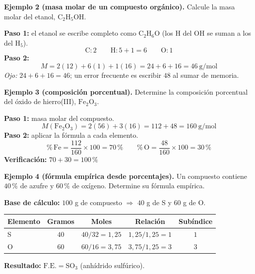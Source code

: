 \documentclass[12pt, letterpaper]{article}
\newcommand{\pc}{\text{\%}}
\begin{document}
\noindent\textbf{Ejemplo 2 (masa molar de un compuesto orgánico).} Calcule la masa molar del etanol, $\text{C}_2\text{H}_5\text{OH}$.

\begin{cuadrosolucion}
  \textbf{Paso 1:} el etanol se escribe completo como $\text{C}_2\text{H}_6\text{O}$ (los H del OH se suman a los del $\text{H}_5$).
  \[
    \text{C}:2 \qquad \text{H}: 5+1 = 6 \qquad \text{O}:1
  \]
  \textbf{Paso 2:}
  \[
    M = 2(12) + 6(1) + 1(16) = 24 + 6 + 16 = \boxed{46\ \text{g/mol}}
  \]
  \emph{Ojo:} $24+6+16 = 46$; un error frecuente es escribir $48$ al sumar de memoria.
\end{cuadrosolucion}

\noindent\textbf{Ejemplo 3 (composición porcentual).} Determine la composición porcentual del óxido de hierro(III), $\text{Fe}_2\text{O}_3$.

\begin{cuadrosolucion}
  \textbf{Paso 1:} masa molar del compuesto.
  \[
    M(\text{Fe}_2\text{O}_3) = 2(56) + 3(16) = 112 + 48 = 160\ \text{g/mol}
  \]
  \textbf{Paso 2:} aplicar la fórmula a cada elemento.
  \[
    \pc\,\text{Fe} = \frac{112}{160}\times100 = 70\,\pc
    \qquad
    \pc\,\text{O} = \frac{48}{160}\times100 = 30\,\pc
  \]
  \textbf{Verificación:} $70 + 30 = 100\,\pc$ \checkmark
\end{cuadrosolucion}

\noindent\textbf{Ejemplo 4 (fórmula empírica desde porcentajes).} Un compuesto contiene $40\,\pc$ de azufre y $60\,\pc$ de oxígeno. Determine su fórmula empírica.

\begin{cuadrosolucion}
  \textbf{Base de cálculo:} $100$ g de compuesto $\Rightarrow$ $40$ g de S y $60$ g de O.

  \begin{center}
    \small
    \setlength{\tabcolsep}{6pt}
    \begin{tabular}{lcccc}
      \toprule
      Elemento & Gramos & Moles & Relación & Subíndice \\
      \midrule
      S & $40$ & $40/32 = 1{,}25$ & $1{,}25/1{,}25 = 1$ & $1$ \\
      O & $60$ & $60/16 = 3{,}75$ & $3{,}75/1{,}25 = 3$ & $3$ \\
      \bottomrule
    \end{tabular}
  \end{center}

  \textbf{Resultado:} $\text{F.E.} = \boxed{\text{SO}_3}$ \quad (anhídrido sulfúrico).
\end{cuadrosolucion}
\end{document}
